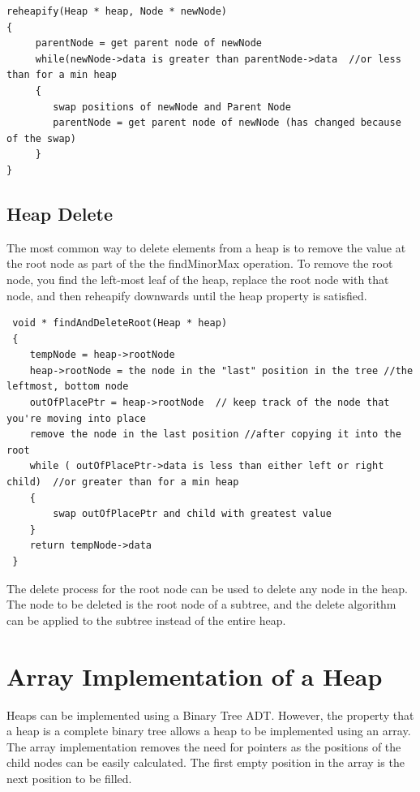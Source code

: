\begin{lstlisting}
reheapify(Heap * heap, Node * newNode)
{
     parentNode = get parent node of newNode
     while(newNode->data is greater than parentNode->data  //or less than for a min heap
     {
     	swap positions of newNode and Parent Node
     	parentNode = get parent node of newNode (has changed because of the swap)
     }
}
 \end{lstlisting}
 
\subsection{Heap Delete}
 
 The most common way to delete elements from a heap is to remove the value at the root node as part of the the findMinorMax operation.
 To remove the root node,  you find the left-most leaf of the heap,  replace the root node with that node, and then reheapify downwards until the heap property is satisfied.
 
 \begin{lstlisting}
 void * findAndDeleteRoot(Heap * heap)
 {
 	tempNode = heap->rootNode
 	heap->rootNode = the node in the "last" position in the tree //the leftmost, bottom node
 	outOfPlacePtr = heap->rootNode  // keep track of the node that you're moving into place
 	remove the node in the last position //after copying it into the root
 	while ( outOfPlacePtr->data is less than either left or right child)  //or greater than for a min heap
 	{
 		swap outOfPlacePtr and child with greatest value
 	}
 	return tempNode->data
 }
 \end{lstlisting}
 
 The delete process for the root node can be used to delete any node in the heap.   The node to be deleted is the root node of a subtree,  and the delete algorithm can be applied to the subtree instead of the entire heap.
 
\section{Array Implementation of a Heap}

Heaps can be implemented using a Binary Tree ADT.  However,  the property that a heap is a complete binary tree allows a heap to be implemented using an array.  The array implementation removes the need for pointers as the positions of the child nodes can be easily calculated.   The first empty position in the array is the next position to be filled.

